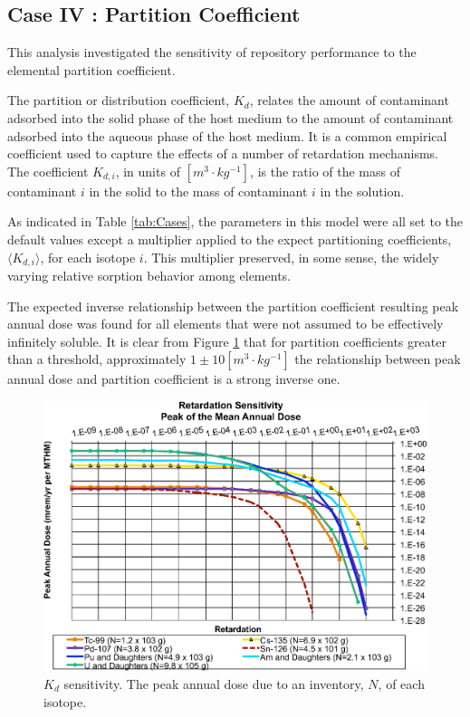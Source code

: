 
\subsection{Case IV : Partition Coefficient}

This analysis investigated the sensitivity of repository performance
to the elemental partition coefficient. 

The partition or distribution coefficient, $K_d$, relates the amount of contaminant adsorbed into the 
solid phase of the host medium to the amount of contaminant adsorbed into the 
aqueous phase of the host medium. It is a common empirical coefficient used to 
capture the effects of a number of retardation mechanisms. The coefficient 
$K_{d,i}$, in units of $[m^3\cdot kg^{-1}]$, is the ratio of the mass of 
contaminant $i$ in the solid to the mass of contaminant $i$ in the solution.

As indicated in Table \ref{tab:Cases}, the parameters in this model were all set 
to the default values except a multiplier applied to the expect partitioning 
coefficients, $\langle K_{d,i} \rangle$, for each isotope $i$. This multiplier 
preserved, in some sense, the widely varying 
relative sorption behavior among elements. 

The expected inverse relationship between the partition coefficient resulting 
peak annual dose was found for all elements that were not assumed to be 
effectively infinitely soluble.  It is clear from Figure \ref{fig:KdSum} that 
for partition coefficients greater than a threshold, approximately 
  $1\pm10[m^3\cdot kg^{-1}]$ the relationship between 
peak annual dose and partition coefficient is a strong inverse one. 

\begin{figure}[H]
  \centering
  \includegraphics[width=\linewidth]{Retardation.eps}
  \caption{$K_d$ sensitivity.  The peak annual dose due to an inventory, 
  $N$, of each isotope.}
  \label{fig:KdSum}
\end{figure}

